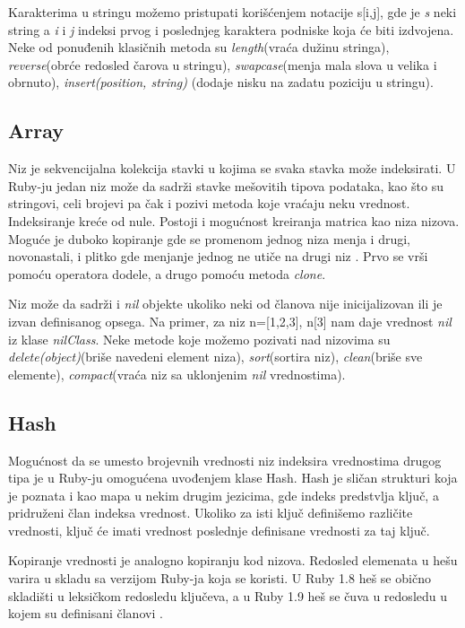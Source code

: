 \documentclass[a4paper]{article}
\begin{document}
Karakterima u stringu možemo pristupati korišćenjem notacije s[i,j], gde je \emph{s} neki string a \emph{i} i \emph{j} indeksi prvog i poslednjeg karaktera podniske koja će biti izdvojena. Neke od ponuđenih klasičnih metoda su \emph{length}(vraća dužinu stringa), \emph{reverse}(obrće redosled čarova u stringu), \emph{swapcase}(menja mala slova u velika i obrnuto), \emph{insert(position, string)} (dodaje nisku na zadatu poziciju u stringu).

\subsection{Array}
Niz je sekvencijalna kolekcija stavki u kojima se svaka stavka može indeksirati. U Ruby-ju jedan niz može da sadrži stavke mešovitih tipova podataka, kao što su stringovi, celi brojevi pa čak i pozivi metoda koje vraćaju neku vrednost. Indeksiranje kreće od nule. Postoji i mogućnost kreiranja matrica kao niza nizova. Moguće je duboko kopiranje gde se promenom jednog niza menja i drugi, novonastali, i plitko gde menjanje jednog ne utiče na drugi niz \cite {HandsOn}. Prvo se vrši pomoću operatora dodele, a drugo pomoću metoda \emph{clone}. 

Niz može da sadrži i \emph{nil} objekte ukoliko neki od članova nije inicijalizovan ili je izvan definisanog opsega. Na primer, za niz n=[1,2,3], n[3]  nam daje vrednost \emph{nil} iz klase \emph{nilClass}. Neke metode koje možemo pozivati nad nizovima su \emph{delete(object)}(briše navedeni element niza), \emph{sort}(sortira niz), \emph{clean}(briše sve elemente), \emph{compact}(vraća niz sa uklonjenim \emph{nil} vrednostima).

\subsection{Hash}
Mogućnost da se umesto brojevnih vrednosti niz indeksira vrednostima drugog tipa je u Ruby-ju omogućena uvođenjem klase Hash. Hash je sličan strukturi koja je poznata i kao mapa u nekim drugim jezicima, gde indeks predstvlja ključ, a pridruženi član indeksa vrednost. Ukoliko za isti ključ definišemo različite vrednosti, ključ  će imati vrednost poslednje definisane vrednosti za taj ključ. 

Kopiranje vrednosti je analogno kopiranju kod nizova. Redosled elemenata u hešu varira u skladu sa verzijom Ruby-ja koja se koristi. U Ruby 1.8 heš se obično skladišti u leksičkom redosledu ključeva, a u Ruby 1.9 heš se čuva u redosledu u kojem su definisani članovi \cite{HandsOn}.
\end{document}
